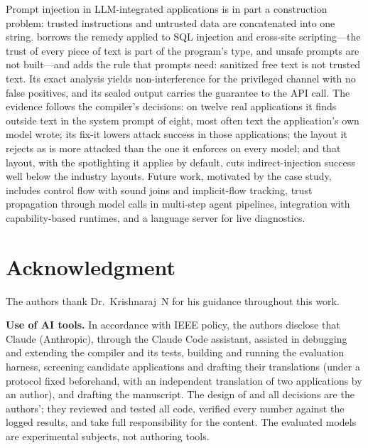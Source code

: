 \documentclass[conference]{IEEEtran}
\begin{document}
Prompt injection in LLM-integrated applications is in part a construction problem: trusted instructions and untrusted data are concatenated into one string. \TL{} borrows the remedy applied to SQL injection and cross-site scripting---the trust of every piece of text is part of the program's type, and unsafe prompts are not built---and adds the rule that prompts need: sanitized free text is not trusted text. Its exact analysis yields non-interference for the privileged channel with no false positives, and its sealed output carries the guarantee to the API call. The evidence follows the compiler's decisions: on twelve real applications it finds outside text in the system prompt of eight, most often text the application's own model wrote; its fix-it lowers attack success in those applications; the layout it rejects as  is more attacked than the one it enforces on every model; and that layout, with the spotlighting it applies by default, cuts indirect-injection success well below the industry layouts. Future work, motivated by the case study, includes control flow with sound joins and implicit-flow tracking, trust propagation through model calls in multi-step agent pipelines, integration with capability-based runtimes, and a language server for live diagnostics.

\section*{Acknowledgment}

The authors thank Dr.~Krishnaraj~N for his guidance throughout this work.

\textbf{Use of AI tools.} In accordance with IEEE policy, the authors disclose that Claude (Anthropic), through the Claude Code assistant, assisted in debugging and extending the compiler and its tests, building and running the evaluation harness, screening candidate applications and drafting their translations (under a protocol fixed beforehand, with an independent translation of two applications by an author), and drafting the manuscript. The design of \TL{} and all decisions are the authors'; they reviewed and tested all code, verified every number against the logged results, and take full responsibility for the content. The evaluated models are experimental subjects, not authoring tools.



\end{document}
